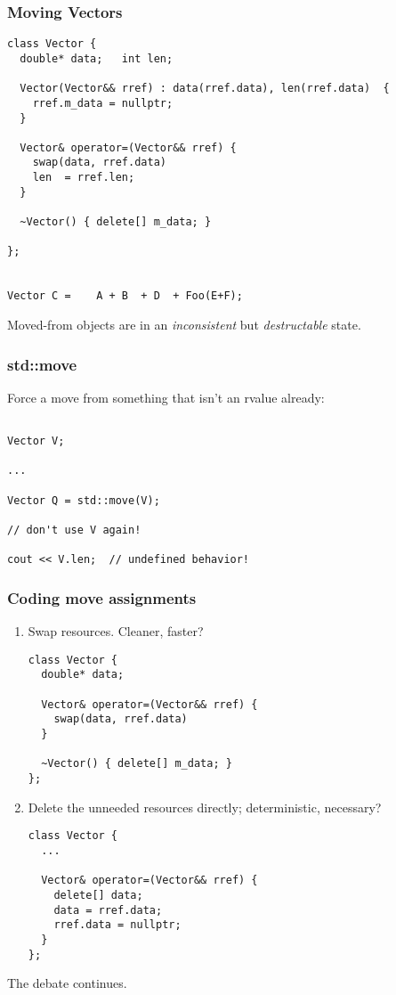 
\begin{frame}[fragile]
\frametitle{Moving Vectors}
{\scriptsize
\begin{verbatim}
class Vector {
  double* data;   int len;

  Vector(Vector&& rref) : data(rref.data), len(rref.data)  {
    rref.m_data = nullptr;
  }

  Vector& operator=(Vector&& rref) {
    swap(data, rref.data)
    len  = rref.len;
  }

  ~Vector() { delete[] m_data; }

};


Vector C =    A + B  + D  + Foo(E+F);

\end{verbatim}
}

Moved-from objects are in an \emph{inconsistent} but
\emph{destructable} state.

\end{frame}


\begin{frame}[fragile]
\frametitle{std::move}
Force a move from something that isn't an rvalue already:
{\scriptsize
\begin{verbatim}

Vector V;

...

Vector Q = std::move(V);

// don't use V again!

cout << V.len;  // undefined behavior!

\end{verbatim}
}

\end{frame}


\begin{frame}[fragile]
\frametitle{Coding move assignments}
\begin{enumerate}
\item Swap resources. Cleaner, faster?
{\scriptsize
\begin{verbatim}
class Vector {
  double* data;

  Vector& operator=(Vector&& rref) {
    swap(data, rref.data)
  }

  ~Vector() { delete[] m_data; }
};
\end{verbatim}
}
\item Delete the unneeded resources directly; deterministic, necessary?
{\scriptsize
\begin{verbatim}
class Vector {
  ...

  Vector& operator=(Vector&& rref) {
    delete[] data;
    data = rref.data;
    rref.data = nullptr;
  }
};
\end{verbatim}
}
\end{enumerate}

The debate continues.
\end{frame}

